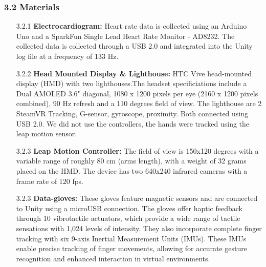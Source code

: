 \documentclass[12pt,oneside,openright]{report}
\begin{document}
\subsubsection*{3.2 Materials}
  \begin{enumerate}
    \item[3.2.1] \textbf{Electrocardiogram:} Heart rate data is collected using an Arduino Uno and a SparkFun Single Lead Heart Rate Monitor - AD8232. The collected data is collected through a USB 2.0 and integrated into the Unity log file at a frequency of 133 Hz.
    \item[3.2.2] \textbf{Head Mounted Display \& Lighthouse:} HTC Vive head-mounted display (HMD) with  two lighthouses.The headset specificiations include a Dual AMOLED 3.6" diagonal, 	1080 x 1200 pixels per eye (2160 x 1200 pixels combined), 90 Hz refresh and a 110 degrees field of view.  The lighthouse are 2 SteamVR Tracking, G-sensor, gyroscope, proximity. Both connected using  USB 2.0. We did not use the controllers, the hands were tracked using the leap motion sensor. 
    \item[3.2.3] \textbf{Leap Motion Controller:}  The field of view is 150x120 degrees with a variable range of roughly 80 cm (arms length), with a weight of 32 grams placed on the HMD. The device has two 640x240 infrared cameras with a frame rate of 120 fps. 
    \item[3.2.3] \textbf{Data-gloves:}  These gloves feature magnetic sensors and are connected to Unity using a microUSB connection. The gloves offer haptic feedback through 10 vibrotactile actuators, which provide a wide range of tactile sensations with 1,024 levels of intensity. They also incorporate complete finger tracking with six 9-axis Inertial Measurement Units (IMUs). These IMUs enable precise tracking of finger movements, allowing for accurate gesture recognition and enhanced interaction in virtual environments.
  \end{enumerate}
\end{document}
